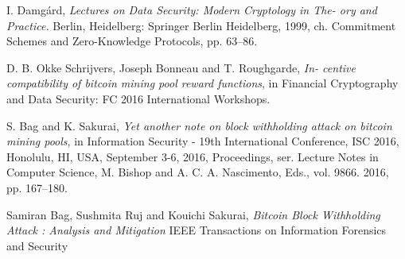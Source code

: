 \documentclass{acm_proc_article-sp}
\begin{document}
\begin{thebibliography}{9}
 I. Damg{\'a}rd, 
 \textit{Lectures on Data Security: Modern Cryptology in The- ory and Practice.} Berlin, Heidelberg: Springer Berlin Heidelberg, 1999, ch. Commitment Schemes and Zero-Knowledge Protocols, pp. 63–86.
 
 D. B. Okke Schrijvers, Joseph Bonneau and T. Roughgarde, 
 \textit{In- centive compatibility of bitcoin mining pool reward functions}, in Financial Cryptography and Data Security: FC 2016 International Workshops.
 
 S. Bag and K. Sakurai, 
 \textit{Yet another note on block withholding attack on bitcoin mining pools}, in Information Security - 19th International Conference, ISC 2016, Honolulu, HI, USA, September 3-6, 2016, Proceedings, ser. Lecture Notes in Computer Science,
 M. Bishop and A. C. A. Nascimento, Eds., vol. 9866. 2016, pp. 167–180.
 
 Samiran Bag, Sushmita Ruj and Kouichi Sakurai,
\textit{Bitcoin Block Withholding Attack : Analysis and
Mitigation}
IEEE Transactions on Information Forensics and Security
\end{thebibliography}
\end{document}
